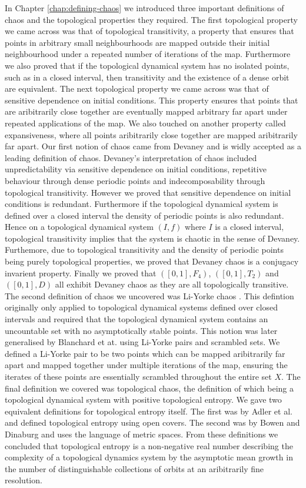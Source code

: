 In Chapter \ref{chap:defining-chaos} we introduced three important definitions of chaos and the topological properties they required. The first topological property we came across was that of topological transitivity, a property that ensures that points in arbitrary small neighbourhoods are mapped outside their initial neighbourhood under a repeated number of iterations of the map. Furthermore we also proved that if the topological dynamical system has no isolated points, such as in a closed interval, then transitivity and the existence of a dense orbit are equivalent. The next topological property we came across was that of sensitive dependence on initial conditions. This property ensures that points that are aribitrarily close together are eventually mapped arbitrary far apart under repeated applications of the map. We also touched on another property called expansiveness, where all points aribitrarily close together are mapped aribitrarily far apart. Our first notion of chaos came from Devaney \cite{devaney} and is widly accepted as a leading definition of chaos. Devaney's interpretation of chaos included unpredictability via sensitive dependence on initial conditions, repetitive behaviour through dense periodic points and indecomposability through topological transitivity. However we proved that sensitive dependence on initial conditions is redundant. Furthermore if the topological dynamical system is defined over a closed interval the density of periodic points is also redundant. Hence on a topological dynamical system $(I, f)$ where $I$ is a closed interval, topological transitivity implies that the system is chaotic in the sense of Devaney. Furthemore, due to topological transitivity and the density of periodic points being purely topological properties, we proved that Devaney chaos is a conjugacy invarient property. Finally we proved that $([0, 1], F_4)$, $([0, 1], T_2)$ and $([0, 1], D)$ all exhibit Devaney chaos as they are all topologically transitive. The second definition of chaos we uncovered was Li-Yorke chaos \cite{li-yorke}. This defintion originally only applied to topological dynamical systems defined over closed intervals and required that the topological dynamical system contains an uncountable set with no asymptotically stable points. This notion was later generalised by Blanchard et at.\cite{blanchard} using Li-Yorke pairs and scrambled sets. We defined a Li-Yorke pair to be two points which can be mapped aribitrarily far apart and mapped together under multiple iterations of the map, ensuring the iterates of these points are essentially scrambled throughout the entire set $X$. The final definition we covered was topological chaos, the definition of which being a topological dynamical system with positive topological entropy. We gave two equivalent definitions for topological entropy itself. The first was by Adler et al.\cite{adler} and defined topological entropy using open covers. The second was by Bowen and Dinaburg \cite{bowen} \cite{dinaburg} and uses the language of metric spaces. From these definitions we concluded that topological entropy is a non-negative real number describing the complexity of a topological dynamics system by the asymptotic mean growth in the number of distinguishable collections of orbits at an aribitrarily fine resolution. 